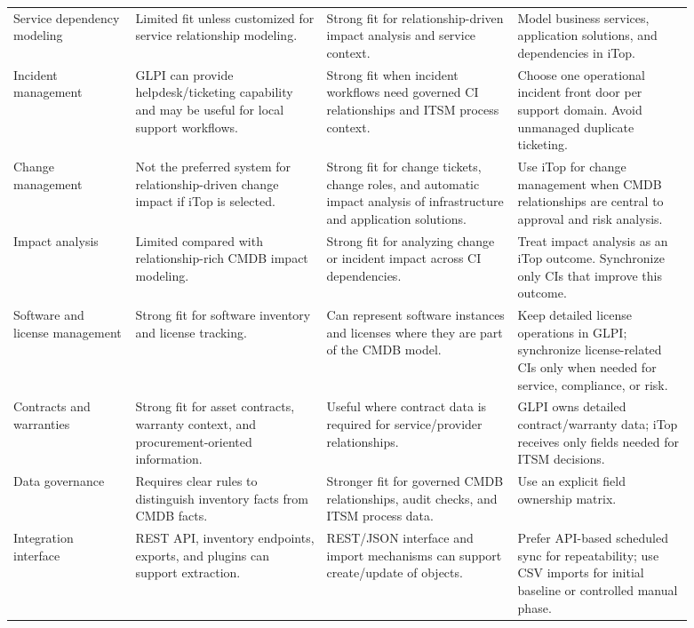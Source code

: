 \documentclass[11pt]{article}
\begin{document}
\begin{landscape}
\begin{longtable}{p{0.16\linewidth}p{0.25\linewidth}p{0.25\linewidth}p{0.23\linewidth}}
\addlinespace
Service dependency modeling & Limited fit unless customized for service relationship modeling. & Strong fit for relationship-driven impact analysis and service context. & Model business services, application solutions, and dependencies in iTop. \\
\addlinespace
Incident management & GLPI can provide helpdesk/ticketing capability and may be useful for local support workflows. & Strong fit when incident workflows need governed CI relationships and ITSM process context. & Choose one operational incident front door per support domain. Avoid unmanaged duplicate ticketing. \\
\addlinespace
Change management & Not the preferred system for relationship-driven change impact if iTop is selected. & Strong fit for change tickets, change roles, and automatic impact analysis of infrastructure and application solutions. & Use iTop for change management when CMDB relationships are central to approval and risk analysis. \\
\addlinespace
Impact analysis & Limited compared with relationship-rich CMDB impact modeling. & Strong fit for analyzing change or incident impact across CI dependencies. & Treat impact analysis as an iTop outcome. Synchronize only CIs that improve this outcome. \\
\addlinespace
Software and license management & Strong fit for software inventory and license tracking. & Can represent software instances and licenses where they are part of the CMDB model. & Keep detailed license operations in GLPI; synchronize license-related CIs only when needed for service, compliance, or risk. \\
\addlinespace
Contracts and warranties & Strong fit for asset contracts, warranty context, and procurement-oriented information. & Useful where contract data is required for service/provider relationships. & GLPI owns detailed contract/warranty data; iTop receives only fields needed for ITSM decisions. \\
\addlinespace
Data governance & Requires clear rules to distinguish inventory facts from CMDB facts. & Stronger fit for governed CMDB relationships, audit checks, and ITSM process data. & Use an explicit field ownership matrix. \\
\addlinespace
Integration interface & REST API, inventory endpoints, exports, and plugins can support extraction. & REST/JSON interface and import mechanisms can support create/update of objects. & Prefer API-based scheduled sync for repeatability; use CSV imports for initial baseline or controlled manual phase. \\

\end{longtable}
\end{landscape}
\end{document}
